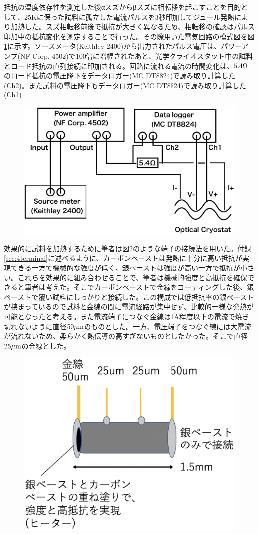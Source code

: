 抵抗の温度依存性を測定した後αスズからβスズに相転移を起こすことを目的として、25Kに保った試料に孤立した電流パルスを3秒印加してジュール発熱により加熱した。スズ相転移前後で抵抗が大きく異なるため、相転移の確認はパルス印加中の抵抗変化を測定することで行った。その際用いた電気回路の模式図を図\ref{fig:schematics_pulse}に示す。ソースメータ(Keithley 2400)から出力されたパルス電圧は、パワーアンプ(NF Corp. 4502)で100倍に増幅されたあと、光学クライオスタット中の試料とロード抵抗の直列接続に印加される。回路に流れる電流の時間変化は、$\rm 5.4\Omega$のロード抵抗の電圧降下をデータロガー(MC DT8824)で読み取り計算した(Ch2)。また試料の電圧降下もデータロガー(MC DT8824)で読み取り計算した(Ch1)
\begin{figure}[!h]
    \begin{center}
   \includegraphics[width=0.5\hsize]{experiment/schematics_pulse.eps}
  \end{center}
  \caption{}
  \label{fig:schematics_pulse}
  \end{figure}
  
効果的に試料を加熱するために筆者は図\ref{fig:schematics_sample}のような端子の接続法を用いた。付録\ref{sec:4terminal}に述べるように、カーボンペーストは発熱に十分に高い抵抗が実現できる一方で機械的な強度が低く、銀ペーストは強度が高い一方で抵抗が小さい。これらを効果的に組み合わせることで、筆者は機械的強度と高抵抗を確保できると筆者は考えた。そこでカーボンペーストで金線をコーティングした後、銀ペーストで覆い試料にしっかりと接続した。この構成では低抵抗率の銀ペーストが挟まっているので試料と金線の間に電流経路が集中せず、比較的一様な発熱が可能となったと考える。また電流端子につなぐ金線は1A程度以下の電流で焼き切れないように直径$\rm 50 \mu m$のものとした。一方、電圧端子をつなぐ線には大電流が流れないため、柔らかく熱伝導の高すぎないものとしたかった。そこで直径$\rm 25 \mu m$の金線とした。
\begin{figure}[!h]
    \begin{center}
   \includegraphics[width=0.4\hsize]{experiment/schematics_sample.eps}
  \end{center}
  \caption{}
  \label{fig:schematics_sample}
\end{figure}

